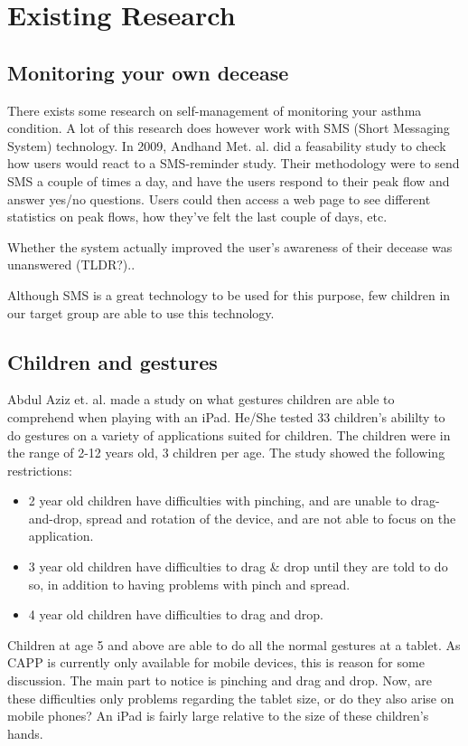 \section{Existing Research}
\label{sec:existing-research}

\subsection{Monitoring your own decease}
There exists some research on self-management of monitoring your asthma condition. A lot of this research does however work with SMS (Short Messaging System) technology. In 2009, Andh and M et. al.\cite{anhoj2004feasibility} did a feasability study to check how users would react to a SMS-reminder study. Their methodology were to send SMS a couple of times a day, and have the users respond to their peak flow and answer yes/no questions. Users could then access a web page to see different statistics on peak flows, how they've felt the last couple of days, etc.


Whether the system actually improved the user's awareness of their decease was unanswered (TLDR?).. 

Although SMS is a great technology to be used for this purpose, few children in our target group are able to use this technology. 


\subsection{Children and gestures}

Abdul Aziz et. al. \cite{aziz2013children} made a study on what gestures children are able to comprehend when playing with an iPad. He/She tested 33 children's abililty to do gestures on a variety of applications suited for children. The children were in the range of 2-12 years old, 3 children per age. The study showed the following restrictions:

\begin{itemize}
  \item 2 year old children have difficulties with pinching, and are unable to drag-and-drop, spread and rotation of the device, and are not able to focus on the application. 
  \item 3 year old children have difficulties to drag \& drop until they are told to do so, in addition to having problems with pinch and spread. 
  \item 4 year old children have difficulties to drag and drop. 
\end{itemize}
Children at age 5 and above are able to do all the normal gestures at a tablet. As CAPP is currently only available for mobile devices, this is reason for some discussion. The main part to notice is pinching and drag and drop. Now, are these difficulties only problems regarding the tablet size, or do they also arise on mobile phones? An iPad is fairly large relative to the size of these children's hands. 
